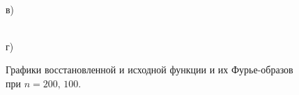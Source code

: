 \documentclass[a5paper, 10pt]{article}
\theoremstyle{definition}
\theoremstyle{plain}
\theoremstyle{remark}
\begin{document}
\begin{figure}[h!]
\begin{minipage}[h!]{0.5\linewidth}
 \\в)
\end{minipage}
\hfill
\begin{minipage}[h!]{0.5\linewidth}
 \\г)
\end{minipage}
\caption{ Графики восстановленной и исходной функции и их Фурье-образов при $n=200, \, 100$.}
\end{figure}
\end{document}

